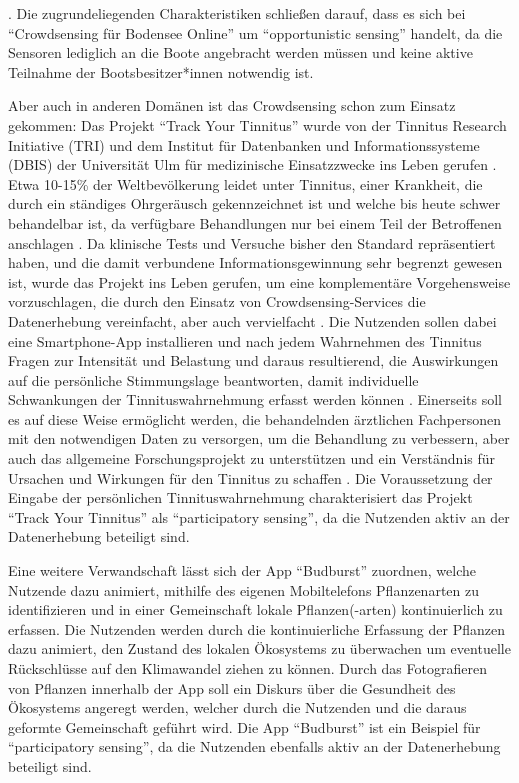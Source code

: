 \cite{Bodensee2021}. Die zugrundeliegenden Charakteristiken schließen darauf, dass es sich bei \enquote{Crowdsensing für Bodensee Online} um \enquote{opportunistic sensing} handelt, da die Sensoren lediglich an die Boote angebracht werden müssen und keine aktive Teilnahme der Bootsbesitzer*innen notwendig ist. 

Aber auch in anderen Domänen ist das Crowdsensing schon zum Einsatz gekommen: Das Projekt \enquote{Track Your Tinnitus} wurde von der Tinnitus Research Initiative (TRI) und dem Institut für Datenbanken und Informationssysteme (DBIS) der Universität Ulm für medizinische Einsatzzwecke ins Leben gerufen \cite{Pryss2017}. Etwa 10-15\% der Weltbevölkerung leidet unter Tinnitus, einer Krankheit, die durch ein ständiges Ohrgeräusch gekennzeichnet ist und welche bis heute schwer behandelbar ist, da verfügbare Behandlungen nur bei einem Teil der Betroffenen anschlagen \cite{langguth2011review}. Da klinische Tests und Versuche bisher den Standard repräsentiert haben, und die damit verbundene Informationsgewinnung sehr begrenzt gewesen ist, wurde das Projekt ins Leben gerufen, um eine komplementäre Vorgehensweise vorzuschlagen, die durch den Einsatz von Crowdsensing-Services die Datenerhebung vereinfacht, aber auch vervielfacht \cite{pryss2015mobile}. Die Nutzenden sollen dabei eine Smartphone-App installieren und nach jedem Wahrnehmen des Tinnitus Fragen zur Intensität und Belastung und daraus resultierend, die Auswirkungen auf die persönliche Stimmungslage beantworten, damit individuelle Schwankungen der Tinnituswahrnehmung erfasst werden können \cite{pryss2015mobile}. Einerseits soll es auf diese Weise ermöglicht werden, die behandelnden ärztlichen Fachpersonen mit den notwendigen Daten zu versorgen, um die Behandlung zu verbessern, aber auch das allgemeine Forschungsprojekt zu unterstützen und ein Verständnis für Ursachen und Wirkungen für den Tinnitus zu schaffen \cite{pryss2015mobile}. Die Voraussetzung der Eingabe der persönlichen Tinnituswahrnehmung charakterisiert das Projekt \enquote{Track Your Tinnitus} als \enquote{participatory sensing}, da die Nutzenden aktiv an der Datenerhebung beteiligt sind.

Eine weitere Verwandschaft lässt sich der App \enquote{Budburst} zuordnen, welche Nutzende dazu animiert, mithilfe des eigenen Mobiltelefons Pflanzenarten zu identifizieren und in einer Gemeinschaft lokale Pflanzen(-arten) kontinuierlich zu erfassen. Die Nutzenden werden durch die kontinuierliche Erfassung der Pflanzen dazu animiert, den Zustand des lokalen Ökosystems zu überwachen um eventuelle Rückschlüsse auf den Klimawandel ziehen zu können. Durch das Fotografieren von Pflanzen innerhalb der App soll ein Diskurs über die Gesundheit des Ökosystems angeregt werden, welcher durch die Nutzenden und die daraus geformte Gemeinschaft geführt wird. Die App \enquote{Budburst} ist ein Beispiel für \enquote{participatory sensing}, da die Nutzenden ebenfalls aktiv an der Datenerhebung beteiligt sind.

